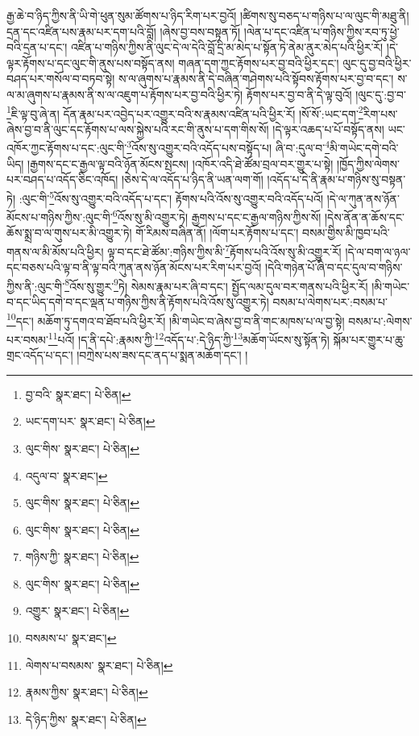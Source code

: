 རྒྱ་ཆེ་བ་ཉིད་ཀྱིས་ནི་ཡི་གེ་ཕུན་སུམ་ཚོགས་པ་ཉིད་རིག་པར་བྱའོ། །ཚིགས་སུ་བཅད་པ་གཉིས་པ་ལ་ལུང་གི་མཐུ་ནི། དྲན་དང་འཛིན་པས་རྣམ་པར་དག་པའི་བློ། །ཞེས་བྱ་བས་བསྟན་ཏོ། །ལེན་པ་དང་འཛིན་པ་གཉིས་ཀྱིས་རབ་ཏུ་ཕྱེ་བའི་དྲན་པ་དང་། འཛིན་པ་གཉིས་ཀྱིས་ནི་ལུང་དེ་ལ་དེའི་བློ་དྲི་མ་མེད་པ་སྟོན་ཏེ་ནེམ་ནུར་མེད་པའི་ཕྱིར་རོ། །དེ་ལྟར་རྟོགས་པ་དང་ལུང་གི་ནུས་པས་བསྟོད་ནས། གཞན་དག་ཀྱང་རྟོགས་པར་བྱ་བའི་ཕྱིར་དང་། ལུང་དུ་བྱ་བའི་ཕྱིར་བཤད་པར་གསོལ་བ་བཏབ་སྟེ། ས་ལ་ཞུགས་པ་རྣམས་ནི་དེ་བཞིན་གཤེགས་པའི་སྟོབས་རྟོགས་པར་བྱ་བ་དང་། ས་ལ་མ་ཞུགས་པ་རྣམས་ནི་ས་ལ་འཇུག་པ་རྟོགས་པར་བྱ་བའི་ཕྱིར་ཏེ། རྟོགས་པར་བྱ་བ་ནི་དེ་ལྟ་བུའོ། །ལུང་དུ་:བྱ་བ་\footnote{བྱ་བའི་  སྣར་ཐང་།  པེ་ཅིན། }ཇི་ལྟ་བུ་ཞེ་ན། དོན་རྣམ་པར་འབྱེད་པར་འགྱུར་བའི་ས་རྣམས་འཛིན་པའི་ཕྱིར་རོ། །སོ་སོ་:ཡང་དག་\footnote{ཡང་དག་པར་  སྣར་ཐང་།  པེ་ཅིན། }རིག་པས་ཞེས་བྱ་བ་ནི་ལུང་དང་རྟོགས་པ་ལས་སྐྱེས་པའི་རང་གི་ནུས་པ་དག་གིས་སོ། །དེ་ལྟར་འཆད་པ་པོ་བསྟོད་ནས། ཡང་འཁོར་ཀྱང་རྟོགས་པ་དང་:ལུང་གི་\footnote{ལུང་གིས་  སྣར་ཐང་།  པེ་ཅིན། }འོས་སུ་འགྱུར་བའི་འདོད་པས་བསྟོད་པ། ཞི་བ་:དུལ་བ་\footnote{འདུལ་བ་  སྣར་ཐང་། }མི་གཡེང་དགེ་བའི་ཡིད། །རྒྱགས་དང་ང་རྒྱལ་ལྟ་བའི་ཉོན་མོངས་སྤངས། །འཁོར་འདི་ཐེ་ཚོམ་བྲལ་བར་གྱུར་པ་སྟེ། །ཁྱོད་ཀྱིས་ལེགས་པར་བཤད་པ་འདོད་ཅིང་འཁོད། །ཅེས་དེ་ལ་འདོད་པ་ཉིད་ནི་ཡན་ལག་གོ། །འདོད་པ་དེ་ནི་རྣམ་པ་གཉིས་སུ་བསྟན་ཏེ། :ལུང་གི་\footnote{ལུང་གིས་  སྣར་ཐང་།  པེ་ཅིན། }འོས་སུ་འགྱུར་བའི་འདོད་པ་དང་། རྟོགས་པའི་འོས་སུ་འགྱུར་བའི་འདོད་པའོ། །དེ་ལ་ཀུན་ནས་ཉོན་མོངས་པ་གཉིས་ཀྱིས་:ལུང་གི་\footnote{ལུང་གིས་  སྣར་ཐང་།  པེ་ཅིན། }འོས་སུ་མི་འགྱུར་ཏེ། རྒྱགས་པ་དང་ང་རྒྱལ་གཉིས་ཀྱིས་སོ། །དེས་ནོན་ན་ཆོས་དང་ཆོས་སྨྲ་བ་ལ་གུས་པར་མི་འགྱུར་ཏེ། གོ་རིམས་བཞིན་ནོ། །ལོག་པར་རྟོགས་པ་དང་། བསམ་གྱིས་མི་ཁྱབ་པའི་གནས་ལ་མི་མོས་པའི་ཕྱིར། ལྟ་བ་དང་ཐེ་ཚོམ་:གཉིས་ཀྱིས་མི་\footnote{གཉིས་ཀྱི་  སྣར་ཐང་།  པེ་ཅིན། }རྟོགས་པའི་འོས་སུ་མི་འགྱུར་རོ། །དེ་ལ་བག་ལ་ཉལ་དང་བཅས་པའི་ལྟ་བ་ནི་ལྟ་བའི་ཀུན་ནས་ཉོན་མོངས་པར་རིག་པར་བྱའོ། །དེའི་གཉེན་པོ་ཞི་བ་དང་དུལ་བ་གཉིས་ཀྱིས་ནི་:ལུང་གི་\footnote{ལུང་གིས་  སྣར་ཐང་།  པེ་ཅིན། }འོས་སུ་གྱུར་\footnote{འགྱུར་  སྣར་ཐང་།  པེ་ཅིན། }ཏེ། སེམས་རྣམ་པར་ཞི་བ་དང་། སྤྱོད་ལམ་དུལ་བར་གནས་པའི་ཕྱིར་རོ། །མི་གཡེང་བ་དང་ཡིད་དགེ་བ་དང་ལྡན་པ་གཉིས་ཀྱིས་ནི་རྟོགས་པའི་འོས་སུ་འགྱུར་ཏེ། བསམ་པ་ལེགས་པར་:བསམ་པ་\footnote{བསམས་པ་  སྣར་ཐང་། }དང་། མཆོག་ཏུ་དགའ་བ་ཐོབ་པའི་ཕྱིར་རོ། །མི་གཡེང་བ་ཞེས་བྱ་བ་ནི་གང་མཁས་པ་ལ་བྱ་སྟེ། བསམ་པ་:ལེགས་པར་བསམ་\footnote{ལེགས་པ་བསམས་  སྣར་ཐང་།  པེ་ཅིན། }པའོ། །ད་ནི་དཔེ་:རྣམས་ཀྱི་\footnote{རྣམས་ཀྱིས་  སྣར་ཐང་།  པེ་ཅིན། }འདོད་པ་:དེ་ཉིད་ཀྱི་\footnote{དེ་ཉིད་ཀྱིས་  སྣར་ཐང་།  པེ་ཅིན། }མཆོག་ཡོངས་སུ་སྟོན་ཏེ། སྐོམ་པར་གྱུར་པ་ཆུ་གྲང་འདོད་པ་དང་། །བཀྲེས་པས་ཟས་དང་ནད་པ་སྨན་མཆོག་དང་། །
